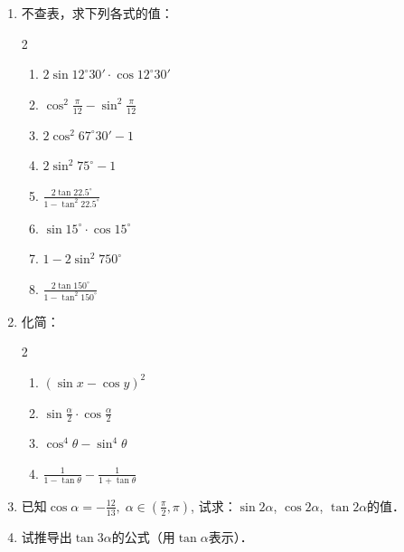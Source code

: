 \begin{ex}
\begin{enumerate}
    \item 不查表，求下列各式的值：
\begin{multicols}{2}
\begin{enumerate}
    \item $2\sin12^{\circ}30'\cdot \cos12^{\circ}30'$
    \item $\cos^2\frac{\pi}{12}-\sin^2\frac{\pi}{12}$
    \item $2\cos^2 67^{\circ}30'-1$
    \item $2\sin^2 75^{\circ}-1$
    \item $\frac{2\tan 22.5^{\circ}}{1-\tan^2 22.5^{\circ}}$
    \item $\sin 15^{\circ}\cdot \cos 15^{\circ}$
    \item $1-2\sin^2 750^{\circ}$
    \item $\frac{2\tan 150^{\circ}}{1-\tan^2 150^{\circ}}$
\end{enumerate}
\end{multicols}
\item 化简：
\begin{multicols}{2}
\begin{enumerate}
    \item $(\sin x-\cos y)^2$
    \item $\sin \frac{\alpha}{2}\cdot\cos\frac{\alpha}{2}$
    \item $\cos^4\theta-\sin^4\theta$
    \item $\frac{1}{1-\tan\theta}-\frac{1}{1+\tan\theta}$
\end{enumerate}
\end{multicols}

\item     已知$\cos\alpha=-\frac{12}{13},\; \alpha\in \left(\frac{\pi}{2},\pi\right)$, 试求：$\sin2\alpha$, $\cos2\alpha$, $\tan2\alpha$的值．

\item 试推导出$\tan3\alpha$的公式（用$\tan\alpha$表示）．


\end{enumerate}
\end{ex}
